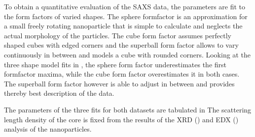 \documentclass[\main/dresen_thesis.tex]{subfiles}
\begin{document}
    To obtain a quantitative evaluation of the SAXS data, the parameters are fit to the form factors of varied shapes.
    The sphere formfactor is an approximation for a small freely rotating nanoparticle that is simple to calculate and neglects the actual morphology of the particles.
    The cube form factor assumes perfectly shaped cubes with edged corners and the superball form factor allows to vary continuously in between and models a cube with rounded corners.
    Looking at the three shape model fits in , the sphere form factor underestimates the first formfactor maxima, while the cube form factor overestimates it in both cases.
    The superball form factor however is able to adjust in between and provides thereby best description of the data.

    The parameters of the three fits for both datasets are tabulated in 
    The scattering length density of the core is fixed from the results of the XRD () and EDX () analysis of the nanoparticles.
\end{document}
